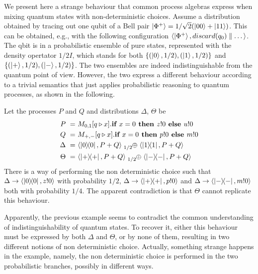 We present here a strange behaviour that common process algebras express when mixing quantum states with non-deterministic choices.
Assume a distribution obtained by tracing out one qubit of a Bell pair $\ket{\Phi^+} = 1/\sqrt{2}(\ket{00} + \ket{11})$.
This can be obtained, e.g., with the following configuration $\langle\ket{\Phi^+}, discard(q_0) \parallel \dots\rangle$.
The qbit is in a probabilistic ensemble of pure states, represented with the density opertator $1/2 I$, which stands for both $\{(\ket{0}, 1/2), (\ket{1}, 1/2)\}$ and $\{(\ket{+}, 1/2), (\ket{-}, 1/2)\}$.
The two ensembles are indeed indistinguishable from the quantum point of view.
However, the two express a different behaviour according to a trivial semantics that just applies probabilistic reasoning to quantum processes, as shown in the following.
\begin{example}
	Let the processes $P$ and $Q$ and distributions $\Delta$, $\Theta$ be
	\begin{align*}
		P\ =\ &M_{0,1}[q \triangleright x] . \ite{x=0}{z!0}{u!0}\\
		Q\ =\ &M_{+,-}[q \triangleright x] . \ite{x=0}{p!0}{m!0}\\
		\Delta\ =\ &\confw{\ketbra{0}{0}, P + Q} \psum{1/2} \confw{\ketbra{1}{1}, P + Q}\\
		\Theta\ =\ &\confw{\ketbra{+}{+}, P + Q} \psum{1/2} \confw{\ketbra{-}{-}, P + Q}
	\end{align*}
	There is a way of performing the non deterministic choice such that $\Delta \rightarrow \langle\ket{0}\!\!\bra{0}, z!0\rangle$ with probability $1/2$, $\Delta \rightarrow \langle\ket{+}\!\!\bra{+}, p!0\rangle$ and $\Delta \rightarrow \langle\ket{-}\!\!\bra{-}, m!0\rangle$ both with probability $1/4$.
	The apparent contradiction is that $\Theta$ cannot replicate this behaviour.
\end{example}

Apparently, the previous example seems to contradict the common understanding of indistinguishability of quantum states.
To recover it, either this behaviour must be expressed by both $\Delta$ and $\Theta$, or by none of them, resulting in two different notions of non deterministic choice.
Actually, something strange happens in the example, namely, the non deterministic choice is performed in the two probabilistic branches, possibly in different ways.
